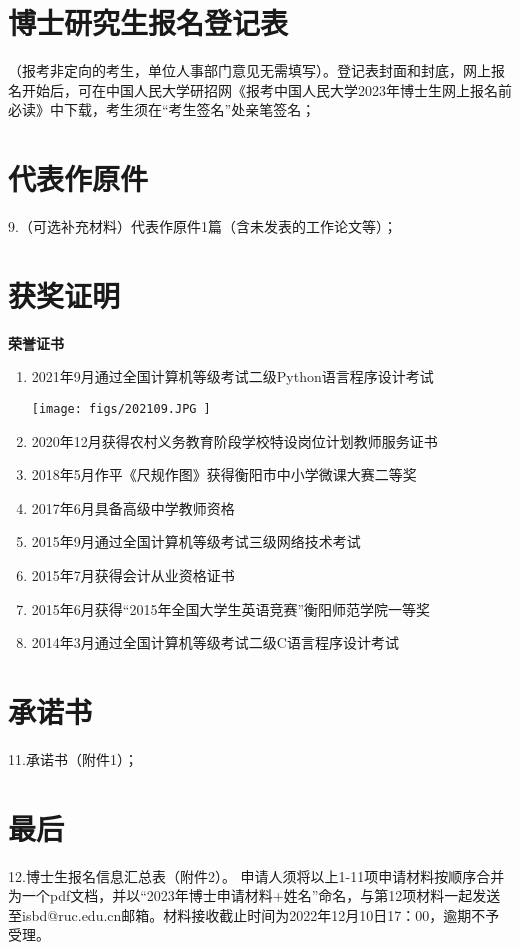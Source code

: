 \documentclass[UFT8]{ctexart}
\def\be{ \begin{enumerate}}
\def\ee{ \end{enumerate}}
\begin{document}
\clearpage
\section{博士研究生报名登记表}
（报考非定向的考生，单位人事部门意见无需填写）。登记表封面和封底，网上报名开始后，可在中国人民大学研招网《报考中国人民大学2023年博士生网上报名前必读》中下载，考生须在“考生签名”处亲笔签名；

\clearpage
\section{代表作原件}
9.（可选补充材料）代表作原件1篇（含未发表的工作论文等）；

\clearpage
\section{获奖证明}
 {\center \bf \kaishu      荣誉证书} 
\be
\item 2021年9月通过全国计算机等级考试二级Python语言程序设计考试

\begin{center}
  \texttt{[image: figs/202109.JPG ]}
\end{center}
  
\item 2020年12月获得农村义务教育阶段学校特设岗位计划教师服务证书
\item 2018年5月作平《尺规作图》获得衡阳市中小学微课大赛二等奖
\item 2017年6月具备高级中学教师资格
\item 2015年9月通过全国计算机等级考试三级网络技术考试
\item 2015年7月获得会计从业资格证书
\item 2015年6⽉获得“2015年全国⼤学⽣英语竞赛”衡阳师范学院⼀等奖
\item 2014年3⽉通过全国计算机等级考试⼆级C语⾔程序设计考试
\ee

\clearpage
\section{承诺书}
11.承诺书（附件1）；
\section{最后}
12.博士生报名信息汇总表（附件2）。
申请人须将以上1-11项申请材料按顺序合并为一个pdf文档，并以“2023年博士申请材料+姓名”命名，与第12项材料一起发送至isbd@ruc.edu.cn邮箱。材料接收截止时间为2022年12月10日17：00，逾期不予受理。
\end{document}
